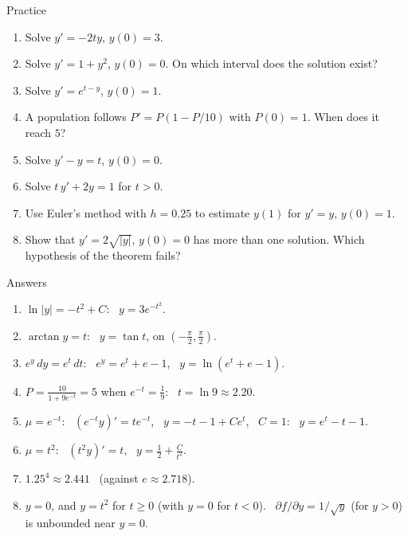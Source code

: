 \documentclass[10pt]{wosm-slides}
\begin{document}
\begin{frame}{Practice}
  \small
  \begin{enumerate}
    \item Solve $y' = -2ty$, $y(0) = 3$.
    \item Solve $y' = 1 + y^2$, $y(0) = 0$. On which interval does the solution exist?
    \item Solve $y' = e^{t - y}$, $y(0) = 1$.
    \item A population follows $P' = P(1 - P/10)$ with $P(0) = 1$. When does it reach $5$?
    \item Solve $y' - y = t$, $y(0) = 0$.
    \item Solve $t\, y' + 2y = 1$ for $t > 0$.
    \item Use Euler's method with $h = 0.25$ to estimate $y(1)$ for $y' = y$, $y(0) = 1$.
    \item Show that $y' = 2\sqrt{|y|}$, $y(0) = 0$ has more than one solution. Which hypothesis of the
      theorem fails?
  \end{enumerate}
\end{frame}

\begin{frame}{Answers}
  \small
  \begin{enumerate}
    \item $\ln|y| = -t^2 + C$: \ $y = 3e^{-t^2}$.
    \item $\arctan y = t$: \ $y = \tan t$, on $(-\frac\pi2, \frac\pi2)$.
    \item $e^y\, dy = e^t\, dt$: \ $e^y = e^t + e - 1$, \ $y = \ln(e^t + e - 1)$.
    \item $P = \frac{10}{1 + 9e^{-t}} = 5$ when $e^{-t} = \frac19$: \ $t = \ln 9 \approx 2.20$.
    \item $\mu = e^{-t}$: \ $(e^{-t}y)' = te^{-t}$, \ $y = -t - 1 + Ce^t$, \ $C = 1$: \ $y = e^t - t - 1$.
    \item $\mu = t^2$: \ $(t^2 y)' = t$, \ $y = \frac12 + \frac{C}{t^2}$.
    \item $1.25^4 \approx 2.441$ \ (against $e \approx 2.718$).
    \item $y = 0$, and $y = t^2$ for $t \ge 0$ (with $y = 0$ for $t < 0$). \ $\partial f / \partial y = 1/\sqrt{y}$
      (for $y > 0$) is unbounded near $y = 0$.
  \end{enumerate}
\end{frame}
\end{document}
